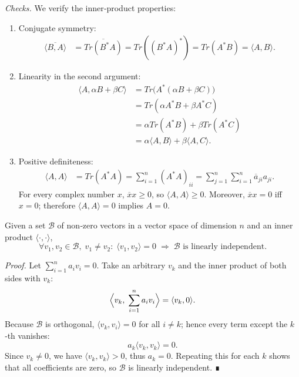\begin{definition}
\textit{Checks.}\newline
We verify the inner‑product properties:

\begin{enumerate}
\item Conjugate symmetry:
\begin{align*}
   \overline{\langle B, A \rangle} &= \overline{Tr(B^*A)} = Tr((B^*A)^*) = Tr(A^*B) = \langle A, B \rangle.
   \end{align*}


\item Linearity in the second argument:
\begin{align*}
   \langle A, \alpha B + \beta C \rangle &= Tr\!\bigl(A^*(\alpha B + \beta C)\bigr) \\
   &= Tr(\alpha A^*B + \beta A^*C) \\
   &= \alpha Tr(A^*B) + \beta Tr(A^*C) \\
   &= \alpha\langle A, B \rangle + \beta\langle A, C \rangle.
   \end{align*}


\item Positive definiteness:
\begin{align*}
   \langle A, A \rangle &= Tr(A^*A) = \sum_{i=1}^n (A^*A)_{ii} = \sum_{j=1}^n\sum_{i=1}^n \overline{a}_{ji}a_{ji}.
   \end{align*}
For every complex number $x$, $\overline{x}x \ge 0$, so $\langle A, A \rangle \ge 0$. Moreover, $\overline{x}x = 0$ iff $x = 0$; therefore $\langle A, A \rangle = 0$ implies $A = 0$.
\end{enumerate}

\end{definition}\begin{theorem}\label{theorem_of_orthogonality_to_lineality}Given a set $\mathcal{B}$ of non‑zero vectors in a vector space of dimension $n$ and an inner product $\langle\cdot,\cdot\rangle$,
\begin{equation}
\forall v_1,v_2\in\mathcal{B},\; v_1\neq v_2:\; \langle v_1,v_2\rangle = 0 \;\Longrightarrow\; \mathcal{B} \text{ is linearly independent}.
\end{equation}

\textit{Proof.}\newline
Let $\sum_{i=1}^n a_i v_i = 0$. Take an arbitrary $v_k$ and the inner product of both sides with $v_k$:
\begin{equation}
\Bigl\langle v_k,\;\sum_{i=1}^n a_i v_i\Bigr\rangle = \langle v_k,0\rangle.
\end{equation}
Because $\mathcal{B}$ is orthogonal, $\langle v_k,v_i\rangle = 0$ for all $i\neq k$; hence every term except the $k$‑th vanishes:
\begin{equation}
a_k \langle v_k,v_k\rangle = 0.
\end{equation}
Since $v_k \neq 0$, we have $\langle v_k,v_k\rangle > 0$, thus $a_k = 0$. Repeating this for each $k$ shows that all coefficients are zero, so $\mathcal{B}$ is linearly independent. ∎

\end{theorem}
